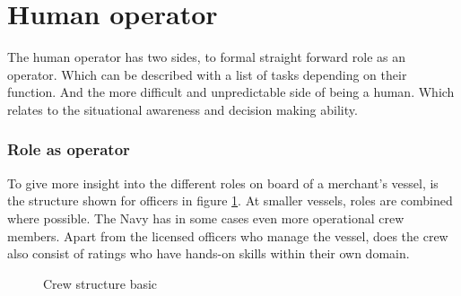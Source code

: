 
\section{Human operator}
The human operator has two sides, to formal straight forward role as an operator. Which can be described with a list of tasks depending on their function. And the more difficult and unpredictable side of being a human. Which relates to the situational awareness and decision making ability.

\subsubsection{Role as operator}
\label{sec:deck-crew}
To give more insight into the different roles on board of a merchant's vessel, is the structure shown for officers in figure \ref{fig:crew-structure}. At smaller vessels, roles are combined where possible. The Navy has in some cases even more operational crew members. Apart from the licensed officers who manage the vessel, does the crew also consist of ratings who have hands-on skills within their own domain. \cite{Nedcon2013}

\begin{figure}[h]
	\centering
	\caption{Crew structure basic}
	\label{fig:crew-structure}
\end{figure}

